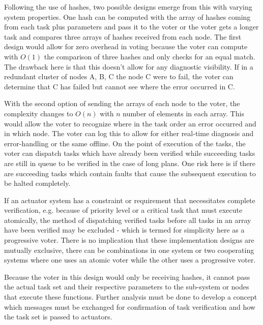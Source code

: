 Following the use of hashes, two possible designs emerge from this with varying system properties. One hash can be computed with the array of hashes coming from each task plus parameters and pass it to the voter or the voter gets a longer task and compares three arrays of hashes received from each node. The first design would allow for zero overhead in voting because the voter can compute with \(O(1)\) the comparison of three hashes and only checks for an equal match. The drawback here is that this doesn’t allow for any diagnostic visibility. If in a redundant cluster of nodes A, B, C the node C were to fail, the voter can determine that C has failed but cannot see where the error occurred in C.

With the second option of sending the arrays of each node to the voter, the complexity changes to \(O(n)\) with \(n\) number of elements in each array. This would allow the voter to recognize where in the task order an error occurred and in which node. The voter can log this to allow for either real-time diagnosis and error-handling or the same offline. On the point of execution of the tasks, the voter can dispatch tasks which have already been verified while succeeding tasks are still in queue to be verified in the case of long plans. One risk here is if there are succeeding tasks which contain faults that cause the subsequent execution to be halted completely.

If an actuator system has a constraint or requirement that necessitates complete verification, e.g. because of priority level or a critical task that must execute atomically, the method of dispatching verified tasks before all tasks in an array have been verified may be excluded - which is termed for simplicity here as a progressive voter. There is no implication that these implementation designs are mutually exclusive, there can be combinations in one system or two cooperating systems where one uses an atomic voter while the other uses a progressive voter.

Because the voter in this design would only be receiving hashes, it cannot pass the actual task set and their respective parameters to the sub-system or nodes that execute these functions. Further analysis must be done to develop a concept which messages must be exchanged for confirmation of task verification and how the task set is passed to actuators.

